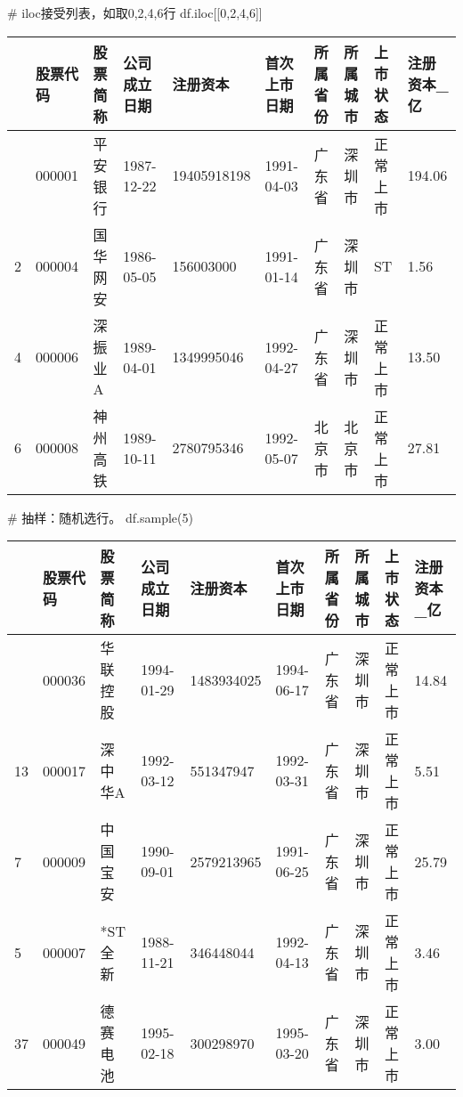 \documentclass[
  letterpaper,
  DIV=11,
  numbers=noendperiod]{scrreprt}
\newenvironment{Shaded}{\begin{snugshade}}{\end{snugshade}}
\newcommand{\CommentTok}[1]{\textcolor[rgb]{0.37,0.37,0.37}{#1}}
\newcommand{\DecValTok}[1]{\textcolor[rgb]{0.68,0.00,0.00}{#1}}
\newcommand{\NormalTok}[1]{\textcolor[rgb]{0.00,0.23,0.31}{#1}}
\begin{document}
\begin{Shaded}
\begin{Highlighting}[]
\CommentTok{\# iloc接受列表，如取0,2,4,6行}
\NormalTok{df.iloc[[}\DecValTok{0}\NormalTok{,}\DecValTok{2}\NormalTok{,}\DecValTok{4}\NormalTok{,}\DecValTok{6}\NormalTok{]]}
\end{Highlighting}
\end{Shaded}

\begin{longtable}[]{@{}llllllllll@{}}
\toprule\noalign{}
& 股票代码 & 股票简称 & 公司成立日期 & 注册资本 & 首次上市日期 &
所属省份 & 所属城市 & 上市状态 & 注册资本\_亿 \\
\midrule\noalign{}
\endhead
\bottomrule\noalign{}
\endlastfoot
0 & 000001 & 平安银行 & 1987-12-22 & 19405918198 & 1991-04-03 & 广东省 &
深圳市 & 正常上市 & 194.06 \\
2 & 000004 & 国华网安 & 1986-05-05 & 156003000 & 1991-01-14 & 广东省 &
深圳市 & ST & 1.56 \\
4 & 000006 & 深振业A & 1989-04-01 & 1349995046 & 1992-04-27 & 广东省 &
深圳市 & 正常上市 & 13.50 \\
6 & 000008 & 神州高铁 & 1989-10-11 & 2780795346 & 1992-05-07 & 北京市 &
北京市 & 正常上市 & 27.81 \\
\end{longtable}

\begin{Shaded}
\begin{Highlighting}[]
\CommentTok{\# 抽样：随机选行。}
\NormalTok{df.sample(}\DecValTok{5}\NormalTok{)}
\end{Highlighting}
\end{Shaded}

\begin{longtable}[]{@{}llllllllll@{}}
\toprule\noalign{}
& 股票代码 & 股票简称 & 公司成立日期 & 注册资本 & 首次上市日期 &
所属省份 & 所属城市 & 上市状态 & 注册资本\_亿 \\
\midrule\noalign{}
\endhead
\bottomrule\noalign{}
\endlastfoot
28 & 000036 & 华联控股 & 1994-01-29 & 1483934025 & 1994-06-17 & 广东省 &
深圳市 & 正常上市 & 14.84 \\
13 & 000017 & 深中华A & 1992-03-12 & 551347947 & 1992-03-31 & 广东省 &
深圳市 & 正常上市 & 5.51 \\
7 & 000009 & 中国宝安 & 1990-09-01 & 2579213965 & 1991-06-25 & 广东省 &
深圳市 & 正常上市 & 25.79 \\
5 & 000007 & *ST 全新 & 1988-11-21 & 346448044 & 1992-04-13 & 广东省 &
深圳市 & 正常上市 & 3.46 \\
37 & 000049 & 德赛电池 & 1995-02-18 & 300298970 & 1995-03-20 & 广东省 &
深圳市 & 正常上市 & 3.00 \\
\end{longtable}
\end{document}
